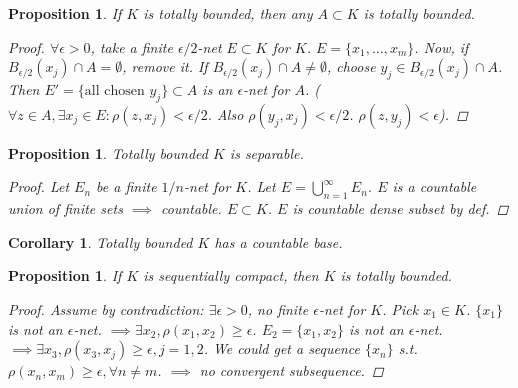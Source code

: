 \documentclass[12pt]{article}
\theoremstyle{blueplain}
\newtheorem{proposition}[theorem]{Proposition}
\newtheorem{corollary}[theorem]{Corollary}
\theoremstyle{bluedef}
\theoremstyle{blueremark}
\numberwithin{equation}{section}
\begin{document}
      \begin{proposition}
        If $K$ is totally bounded, then any $A \subset K$ is totally bounded.
        \begin{proof}
          $\forall \epsilon > 0$, take a finite $\epsilon/2$-net $E \subset K$ for $K$.
          $E = \{x_1, \ldots, x_m\}$.
          Now, if $B_{\epsilon/2}(x_j) \cap A = \emptyset$, remove it.
          If $B_{\epsilon/2}(x_j) \cap A \neq \emptyset$, choose $y_j \in B_{\epsilon/2}(x_j) \cap A$.
          Then $E' = \{ \text{all chosen } y_j \} \subset A$ is an $\epsilon$-net for $A$.
          ($\forall z \in A, \exists x_j \in E: \rho(z, x_j) < \epsilon/2$. Also $\rho(y_j, x_j) < \epsilon/2$. $\rho(z, y_j) < \epsilon$).
        \end{proof}
      \end{proposition}

      \begin{proposition}
        Totally bounded $K$ is separable.
        \begin{proof}
          Let $E_n$ be a finite $1/n$-net for $K$.
          Let $E = \bigcup_{n=1}^\infty E_n$.
          $E$ is a countable union of finite sets $\implies$ countable.
          $E \subset K$. $E$ is countable dense subset by def.
        \end{proof}
      \end{proposition}

      \begin{corollary}
        Totally bounded $K$ has a countable base.
      \end{corollary}

      \begin{proposition}
        If $K$ is sequentially compact, then $K$ is totally bounded.
        \begin{proof}
          Assume by contradiction: $\exists \epsilon > 0$, no finite $\epsilon$-net for $K$.
          Pick $x_1 \in K$. $\{x_1\}$ is not an $\epsilon$-net.
          $\implies \exists x_2, \rho(x_1, x_2) \geq \epsilon$.
          $E_2 = \{x_1, x_2\}$ is not an $\epsilon$-net.
          $\implies \exists x_3, \rho(x_3, x_j) \geq \epsilon, j=1,2$.
          We could get a sequence $\{x_n\}$ s.t. $\rho(x_n, x_m) \geq \epsilon, \forall n \neq m$.
          $\implies$ no convergent subsequence.
        \end{proof}
      \end{proposition}
\end{document}
